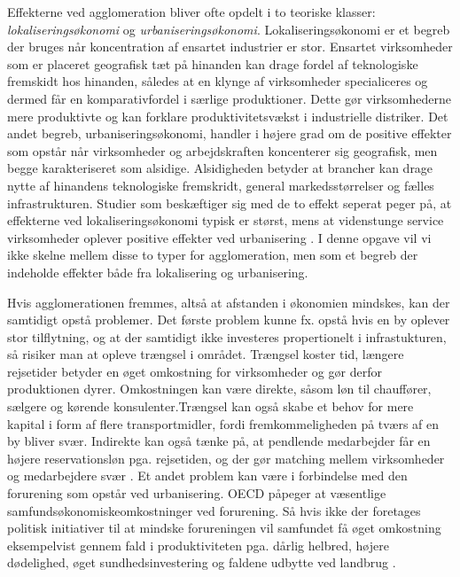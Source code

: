 \documentclass[a4paper, 12pt, titlepage]{article}
\begin{document}
Effekterne ved agglomeration bliver ofte opdelt i to teoriske klasser: \emph{lokaliseringsøkonomi} og \emph{urbaniseringsøkonomi}. Lokaliseringsøkonomi er et begreb der bruges når koncentration af ensartet industrier er stor. Ensartet virksomheder som er placeret geografisk tæt på hinanden kan drage fordel af teknologiske fremskidt hos hinanden, således at en klynge af virksomheder specialiceres og dermed får en komparativfordel i særlige produktioner. Dette gør virksomhederne mere produktivte og kan forklare produktivitetsvækst i industrielle distriker.  Det andet begreb, urbaniseringsøkonomi, handler i højere grad om de positive effekter som opstår når virksomheder og arbejdskraften koncenterer sig geografisk, men begge karakteriseret som alsidige. Alsidigheden betyder at brancher kan drage nytte af hinandens teknologiske fremskridt, general markedsstørrelser og fælles infrastrukturen. Studier som beskæftiger sig med de to effekt seperat peger på, at effekterne ved lokaliseringsøkonomi typisk er størst, mens at videnstunge service virksomheder oplever positive effekter ved urbanisering \cite{melo2009meta}. I denne opgave vil vi ikke skelne mellem disse to typer for agglomeration, men som et begreb der indeholde effekter både fra lokalisering og urbanisering.


Hvis agglomerationen fremmes, altså at afstanden i økonomien mindskes, kan der samtidigt opstå problemer. Det første problem kunne fx. opstå hvis en by oplever stor tilflytning, og at der samtidigt ikke investeres propertionelt i infrastukturen, så risiker man at opleve trængsel i området. Trængsel koster tid, længere rejsetider betyder en øget omkostning for virksomheder og gør derfor produktionen dyrer. Omkostningen kan være direkte, såsom løn til chauffører, sælgere og kørende konsulenter.Trængsel kan også skabe et behov for mere kapital i form af flere transportmidler, fordi fremkommeligheden på tværs af en by bliver svær. Indirekte kan også tænke på, at pendlende medarbejder får en højere reservationsløn pga. rejsetiden, og der gør matching mellem virksomheder og medarbejdere svær \cite{sorensen2014infrastruktur}. Et andet problem kan være i forbindelse med den forurening som opstår ved urbanisering. OECD påpeger at væsentlige samfundsøkonomiskeomkostninger ved forurening. Så hvis ikke der foretages politisk initiativer til at mindske forureningen vil samfundet få øget omkostning eksempelvist gennem fald i produktiviteten pga. dårlig helbred, højere dødelighed, øget sundhedsinvestering og faldene udbytte ved landbrug \cite{klimonteconomic}.
\end{document}
